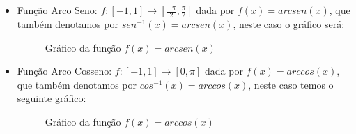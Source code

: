 \begin{itemize}
  Lembramos que $cotan(x)= \dfrac{cos(x)}{sen(x)}$ logo o domínio da função cotangente é o conjunto dos $x \in \R$ tais que $sen(x) \neq 0$.
  
  Já no gráfico da função cotangente vemos a repetição do comportamento do intervalo $]0, \pi[$, e temos que
  \[cotan(x + \pi)= cotan(x)\]
  portanto esta é uma função periódica de período $\pi$.

  \textbf{Funções Inversas}
  
  As funções trigonométricas admitem inversas quando restringimos seus domínios a um único período da função, assim temos por exemplo as seguintes funções:
  
  \item Função Arco Seno: $f: [-1, 1] \rightarrow [\frac{-\pi}{2}, \frac{\pi}{2}]$ dada por $f(x)= arcsen(x)$, que também denotamos por $sen^{-1}(x)= arcsen (x)$, neste caso o gráfico será:

  \begin{figure}[H]
  \centering
    \caption{Gráfico da função $f(x)= arcsen(x)$}
  \end{figure}
  

  \item Função Arco Cosseno: $f: [-1, 1] \rightarrow [0, \pi]$ dada por $f(x)= arccos(x)$, que também denotamos por $cos^{-1}(x)= arccos (x)$, neste caso temos o seguinte gráfico:

  \begin{figure}[H]
  \centering
    \caption{Gráfico da função $f(x)= arccos(x)$}
  \end{figure}
  

\end{itemize}
